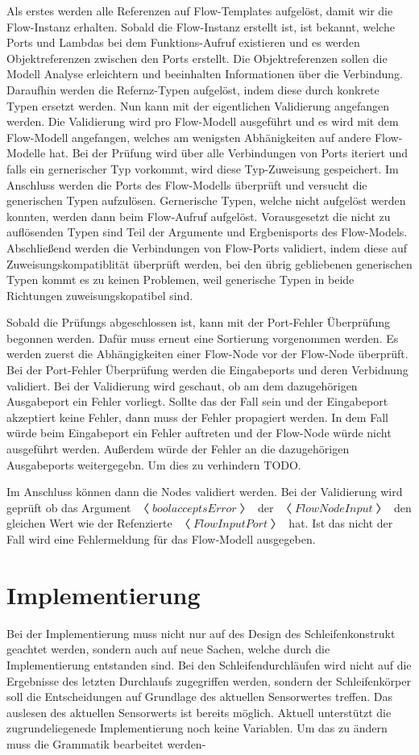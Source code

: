 \documentclass{article}
\begin{document}
    Als erstes werden alle Referenzen auf Flow-Templates aufgelöst, damit wir die Flow-Instanz erhalten. Sobald die Flow-Instanz erstellt ist, ist bekannt, welche Ports und Lambdas bei dem Funktions-Aufruf existieren und es werden Objektreferenzen zwischen den Ports erstellt.
    Die Objektreferenzen sollen die Modell Analyse erleichtern und beeinhalten Informationen über die Verbindung.
    Daraufhin werden die Refernz-Typen aufgelöst, indem diese durch konkrete Typen ersetzt werden.
    Nun kann mit der eigentlichen Validierung angefangen werden. Die Validierung wird pro Flow-Modell ausgeführt und es wird mit dem Flow-Modell angefangen, welches am wenigsten Abhänigkeiten auf andere Flow-Modelle hat.
    Bei der Prüfung wird über alle Verbindungen von Ports iteriert und falls ein gernerischer Typ vorkommt, wird diese Typ-Zuweisung gespeichert.
    Im Anschluss werden die Ports des Flow-Modells überprüft und versucht die generischen Typen aufzulösen. Gernerische Typen, welche nicht aufgelöst werden konnten, werden dann beim Flow-Aufruf aufgelöst. Vorausgesetzt die nicht zu auflösenden Typen sind Teil der Argumente und Ergbenisports des Flow-Models.
    Abschließend werden die Verbindungen von Flow-Ports validiert, indem diese auf Zuweisungskompatiblität überprüft werden, bei den übrig gebliebenen generischen Typen kommt es zu keinen Problemen, weil generische Typen in beide Richtungen zuweisungskopatibel sind.

    Sobald die Prüfungs abgeschlossen ist, kann mit der Port-Fehler Überprüfung begonnen werden.
    Dafür muss erneut eine Sortierung vorgenommen werden. Es werden zuerst die Abhängigkeiten einer Flow-Node vor der Flow-Node überprüft.
    Bei der Port-Fehler Überprüfung werden die Eingabeports und deren Verbidnung validiert.
    Bei der Validierung wird geschaut, ob am dem dazugehörigen Ausgabeport ein Fehler vorliegt. Sollte das der Fall sein und der Eingabeport akzeptiert keine Fehler, dann muss der Fehler propagiert werden.
    In dem Fall würde beim Eingabeport ein Fehler auftreten und der Flow-Node würde nicht ausgeführt werden. Außerdem würde der Fehler an die dazugehörigen Ausgabeports weitergegebn.
    Um dies zu verhindern TODO.

    Im Anschluss können dann die Nodes validiert werden. 
    Bei der Validierung wird geprüft ob das Argument $〈bool acceptsError〉$ der $〈FlowNodeInput〉$ den gleichen Wert wie der Refenzierte $〈FlowInputPort〉$ hat. Ist das nicht der Fall wird eine Fehlermeldung für das Flow-Modell ausgegeben.
    \newpage
    \section{Implementierung}
    Bei der Implementierung muss nicht nur auf des Design des Schleifenkonstrukt geachtet werden, sondern auch auf neue Sachen, welche durch die Implementierung entstanden sind.
    Bei den Schleifendurchläufen wird nicht auf die Ergebnisse des letzten Durchlaufs zugegriffen werden, sondern der Schleifenkörper soll die Entscheidungen auf Grundlage des aktuellen Sensorwertes treffen.
    Das auslesen des aktuellen Sensorwerts ist bereits möglich.
    Aktuell unterstützt die zugrundeliegenede Implementierung noch keine Variablen. Um das zu ändern muss die Grammatik bearbeitet werden-
\end{document}
